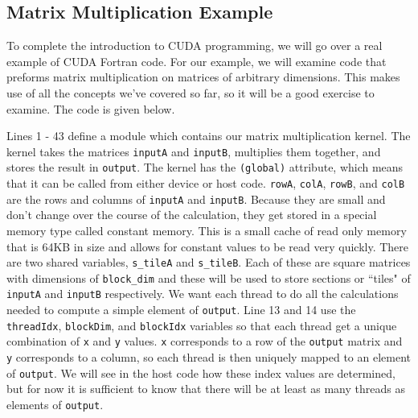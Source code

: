 \documentclass[12pt]{report}
\begin{document}
\subsection{Matrix Multiplication Example}
To complete the introduction to CUDA programming, we will go over a real example of CUDA Fortran code. For our example, we will examine code that preforms matrix multiplication on matrices of arbitrary dimensions. This makes use of all the concepts we've covered so far, so it will be a good exercise to examine. The code is given below.


Lines 1 - 43 define a module which contains our matrix multiplication kernel. The kernel takes the matrices \texttt{inputA} and \texttt{inputB}, multiplies them together, and stores the result in \texttt{output}. The kernel has the \texttt{{\color{myblue}{attributes}}(global)} attribute, which means that it can be called from either device or host code. \texttt{rowA}, \texttt{colA}, \texttt{rowB}, and \texttt{colB} are the rows and columns of \texttt{inputA} and \texttt{inputB}. Because they are small and don't change over the course of the calculation, they get stored in a special memory type called constant memory. This is a small cache of read only memory that is 64KB in size and allows for constant values to be read very quickly. There are two shared variables, \texttt{s\_tileA} and \texttt{s\_tileB}. Each of these are square matrices with dimensions of \texttt{block\_dim} and these will be used to store sections or ``tiles" of \texttt{inputA} and \texttt{inputB} respectively. We want each thread to do all the calculations needed to compute a simple element of \texttt{output}. Line 13 and 14 use the \texttt{threadIdx}, \texttt{blockDim}, and \texttt{blockIdx} variables so that each thread get a unique combination of \texttt{x} and \texttt{y} values. \texttt{x} corresponds to a row of the \texttt{output} matrix and \texttt{y} corresponds to a column, so each thread is then uniquely mapped to an element of \texttt{output}. We will see in the host code how these index values are determined, but for now it is sufficient to know that there will be at least as many threads as elements of \texttt{output}.
\end{document}
